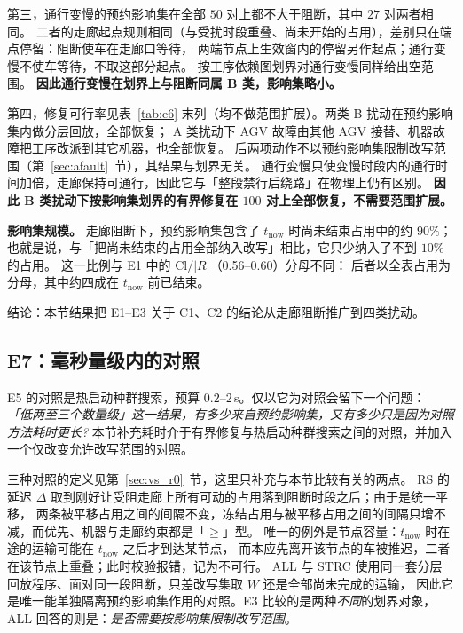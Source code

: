 \documentclass[manuscript,screen,review]{acmart}
\providecommand{\STRC}{\textsc{STRC}}
\newcommand{\EoneCloLo}{0.56}
\newcommand{\EoneCloHi}{0.60}
\newcommand{\ClosureAliveFrac}{90\%}
\begin{document}
第三，通行变慢的预约影响集在全部 \(50\) 对上都不大于阻断，其中 \(27\) 对两者相同。
二者的走廊起点规则相同（与受扰时段重叠、尚未开始的占用），差别只在端点停留：阻断使车在走廊口等待，
两端节点上生效窗内的停留另作起点；通行变慢不使车等待，不取这部分起点。
按工序依赖图划界对通行变慢同样给出空范围。
\textbf{因此通行变慢在划界上与阻断同属 B 类，影响集略小。}

第四，修复可行率见表~\ref{tab:e6} 末列（均不做范围扩展）。两类 B 扰动在预约影响集内做分层回放，全部恢复；
A 类扰动下 AGV 故障由其他 AGV 接替、机器故障把工序改派到其它机器，也全部恢复。
后两项动作不以预约影响集限制改写范围（第~\ref{sec:afault}~节），其结果与划界无关。
通行变慢只使变慢时段内的通行时间加倍，走廊保持可通行，因此它与「整段禁行后绕路」在物理上仍有区别。
\textbf{因此 B 类扰动下按影响集划界的有界修复在 \(100\) 对上全部恢复，不需要范围扩展。}

\textbf{影响集规模。} 走廊阻断下，预约影响集包含了 \(t_{\mathrm{now}}\) 时尚未结束占用中的约 \(\ClosureAliveFrac\)；
也就是说，与「把尚未结束的占用全部纳入改写」相比，它只少纳入了不到 \(10\%\) 的占用。
这一比例与 E1 中的 \(\mathrm{Cl}/|R|\)（\EoneCloLo--\EoneCloHi）分母不同：
后者以全表占用为分母，其中约四成在 \(t_{\mathrm{now}}\) 前已结束。

结论：本节结果把 E1--E3 关于 C1、C2 的结论从走廊阻断推广到四类扰动。

\subsection{E7：毫秒量级内的对照}
\label{sec:cheap}

E5 的对照是热启动种群搜索，预算 \(0.2\)--\(2\)\,s。仅以它为对照会留下一个问题：
\emph{「低两至三个数量级」这一结果，有多少来自预约影响集，又有多少只是因为对照方法耗时更长?}
本节补充耗时介于有界修复与热启动种群搜索之间的对照，并加入一个仅改变允许改写范围的对照。

三种对照的定义见第~\ref{sec:vs_r0}~节，这里只补充与本节比较有关的两点。
RS 的延迟 \(\Delta\) 取到刚好让受阻走廊上所有可动的占用落到阻断时段之后；由于是统一平移，
两条被平移占用之间的间隔不变，冻结占用与被平移占用之间的间隔只增不减，而优先、机器与走廊约束都是「\(\ge\)」型。
唯一的例外是节点容量：\(t_{\mathrm{now}}\) 时在途的运输可能在 \(t_{\mathrm{now}}\) 之后才到达某节点，
而本应先离开该节点的车被推迟，二者在该节点上重叠；此时校验报错，记为不可行。
ALL 与 \STRC{} 使用同一套分层回放程序、面对同一段阻断，只差改写集取 \(W\) 还是全部尚未完成的运输，
因此它是唯一能单独隔离预约影响集作用的对照。E3 比较的是两种\emph{不同}的划界对象，
ALL 回答的则是：\emph{是否需要按影响集限制改写范围}。
\end{document}
